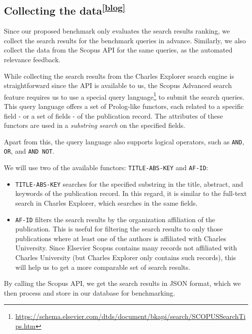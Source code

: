 \subsection[Collecting the data]{Collecting the data\textsuperscript{\href{https://barjin.github.io/edu/thesis-blog/collecting-data/}{[blog]}}}\label{collecting-data}

Since our proposed benchmark only evaluates the search results ranking, we collect the search results for the benchmark queries in advance.
Similarly, we also collect the data from the Scopus API for the same queries, as the automated relevance feedback.

While collecting the search results from the Charles Explorer search engine is straightforward since the API is available to us, 
the Scopus Advanced search feature requires us to use a special query language\footnote{\url{https://schema.elsevier.com/dtds/document/bkapi/search/SCOPUSSearchTips.htm}} to submit the search queries. 
This query language offers a set of Prolog-like functors, 
each related to a specific field - or a set of fields - of the publication record. 
The attributes of these functors are used in a \textit{substring search} on the specified fields.

Apart from this, the query language also supports logical operators, such as \texttt{AND}, \texttt{OR}, and \texttt{AND NOT}.

We will use two of the available functors: \texttt{TITLE-ABS-KEY} and \texttt{AF-ID}:

\begin{itemize}
    \item \texttt{TITLE-ABS-KEY} searches for the specified substring in the title, abstract, and keywords of the publication record. 
    In this regard, it is similar to the full-text search in Charles Explorer, which searches in the same fields.
    \item \texttt{AF-ID} filters the search results by the organization affiliation of the publication. This is useful for filtering the search results to only those publications where at least one of the authors is affiliated with Charles University. Since Elsevier Scopus contains many records not affiliated with Charles University (but Charles Explorer only contains such records), this will help us to get a more comparable set of search results.
\end{itemize}

By calling the Scopus API, we get the search results in JSON format, which we then process and store in our database for benchmarking.


